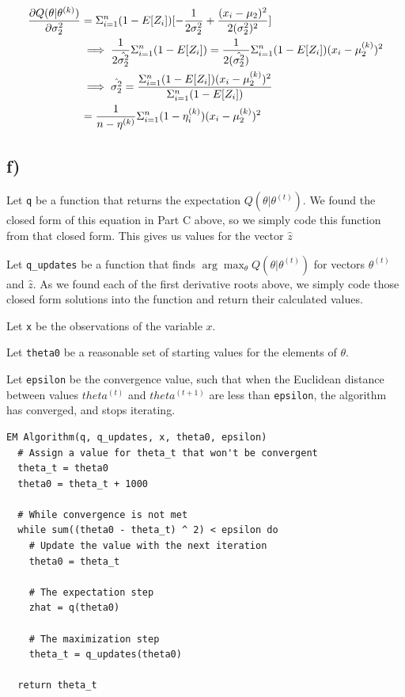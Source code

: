 \documentclass[]{article}
\begin{document}
\begin{align*}
\frac{\partial Q(\theta | \theta^{(k)})}{\partial \sigma_2^{2}} &= \Sigma_{i=1}^{n}(1 - E[Z_i])[-\frac{1}{2 \sigma_2^2} + \frac{(x_i -\mu_2)^2}{2(\sigma_2^2)^2}] \\
&\implies \frac{1}{2\hat{\sigma_2^2}} \Sigma_{i=1}^{n}(1 - E[Z_i]) = \frac{1}{2(\hat{\sigma_2^2})} \Sigma_{i=1}^{n} (1 - E[Z_i])(x_i - \mu_2^{(k)})^2 \\
&\implies \hat{\sigma_2^2} = \frac{\Sigma_{i=1}^{n} (1 - E[Z_i]) (x_i - \mu_2^{(k)})^2}{\Sigma_{i=1}^{n}(1 - E[Z_i])}  \\
&= \frac{1}{n - \eta^{(k)}} \Sigma_{i=1}^{n} (1 - \eta^{(k)}_i)(x_i - \mu_2^{(k)})^2
\end{align*}

\subsection{f)}\label{f}

Let \texttt{q} be a function that returns the expectation
\(Q(\theta | \theta^{(t)})\). We found the closed form of this equation
in Part C above, so we simply code this function from that closed form.
This gives us values for the vector \(\hat{z}\)

Let \texttt{q\_updates} be a function that finds
\(\arg \max_\theta Q(\theta | \theta^{(t)})\) for vectors
\(\theta^{(t)}\) and \(\hat{z}\). As we found each of the first
derivative roots above, we simply code those closed form solutions into
the function and return their calculated values.

Let \texttt{x} be the observations of the variable \(x\).

Let \texttt{theta0} be a reasonable set of starting values for the
elements of \(\theta\).

Let \texttt{epsilon} be the convergence value, such that when the
Euclidean distance between values \(theta^{(t)}\) and
\(theta^{(t + 1)}\) are less than \texttt{epsilon}, the algorithm has
converged, and stops iterating.

\begin{verbatim}
EM Algorithm(q, q_updates, x, theta0, epsilon)
  # Assign a value for theta_t that won't be convergent
  theta_t = theta0
  theta0 = theta_t + 1000
  
  # While convergence is not met
  while sum((theta0 - theta_t) ^ 2) < epsilon do 
    # Update the value with the next iteration
    theta0 = theta_t
    
    # The expectation step
    zhat = q(theta0)
    
    # The maximization step
    theta_t = q_updates(theta0)

  return theta_t
\end{verbatim}
\end{document}
